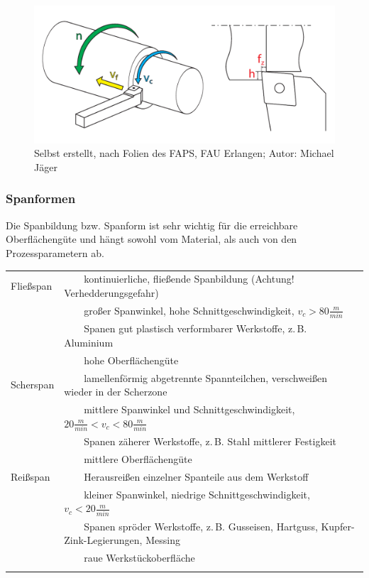 \documentclass{\basedir/fablab-document}
\newcommand{\tabitem}{~~\llap{\textbullet}~~}
\begin{document}
\begin{figure}[ht]
\centering
\includegraphics[width = 0.9\linewidth]{img/drehprozess}
\caption{Selbst erstellt, nach Folien des FAPS, FAU Erlangen; Autor: Michael Jäger}
\end{figure}


\subsubsection{Spanformen}
Die Spanbildung bzw. Spanform ist sehr wichtig für die erreichbare Oberflächengüte und hängt sowohl vom Material, als auch von den Prozessparametern ab. \\[1em]
\begin{tabular}{ll}
    Fließspan		& \tabitem kontinuierliche, fließende Spanbildung (Achtung! Verhedderungsgefahr)													\\ 
								&	\tabitem großer Spanwinkel, hohe Schnittgeschwindigkeit, $v_c > 80 \frac{m}{min} $											\\
								&	\tabitem Spanen gut plastisch verformbarer Werkstoffe, z.\,B. Aluminium																		\\
								&	\tabitem hohe Oberflächengüte																																						\\ \addlinespace
    Scherspan		& \tabitem lamellenförmig abgetrennte Spannteilchen, verschweißen wieder in der Scherzone									\\ 
								&	\tabitem mittlere Spanwinkel und Schnittgeschwindigkeit, $20 \frac{m}{min} < v_c < 80 \frac{m}{min} $		\\
								&	\tabitem Spanen zäherer Werkstoffe, z.\,B. Stahl mittlerer Festigkeit 																		\\
								&	\tabitem mittlere Oberflächengüte																																				\\ \addlinespace
    Reißspan		& \tabitem Herausreißen einzelner Spanteile aus dem Werkstoff																							\\ 
								&	\tabitem kleiner Spanwinkel, niedrige Schnittgeschwindigkeit, $v_c < 20 \frac{m}{min} $									\\
								&	\tabitem Spanen spröder Werkstoffe, z.\,B. Gusseisen, Hartguss, Kupfer-Zink-Legierungen, Messing					\\
								&	\tabitem raue Werkstückoberfläche																																				\\ \addlinespace
\end{tabular}
\end{document}
